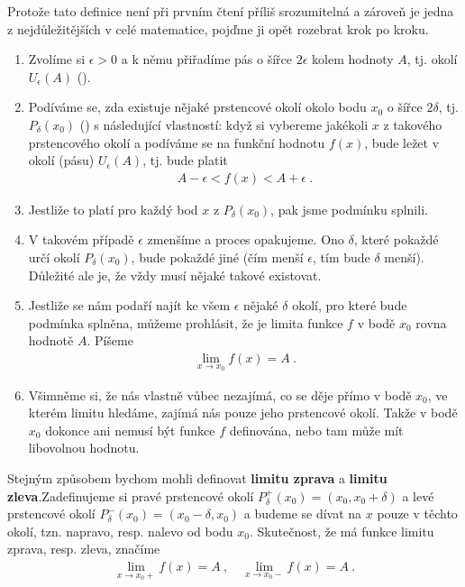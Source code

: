 Protože tato definice není při prvním čtení příliš srozumitelná a zároveň je jedna z nejdůležitějších v celé matematice, pojďme ji opět rozebrat krok po kroku.
\begin{enumerate}
    \item Zvolíme si $\epsilon>0$ a k němu přiřadíme pás o šířce $2\epsilon$ kolem hodnoty $A$, tj. okolí $U_\epsilon(A)$ ().
    \item Podíváme se, zda existuje nějaké prstencové okolí okolo bodu $x_0$ o šířce $2\delta$, tj. $P_\delta (x_0)$ () s následující vlastností: když si vybereme jakékoli $x$ z takového prstencového okolí a podíváme se na funkční hodnotu $f(x)$, bude ležet v okolí (pásu) $U_\epsilon(A)$, tj. bude platit
    \begin{align}
        A - \epsilon < f(x) < A + \epsilon \:.
    \end{align}
    \item Jestliže to platí pro každý bod $x$ z $P_\delta(x_0)$, pak jsme podmínku splnili.
    \item V takovém případě $\epsilon$ zmenšíme a proces opakujeme. Ono $\delta$, které pokaždé určí okolí $P_\delta (x_0)$, bude pokaždé jiné (čím menší $\epsilon$, tím bude $\delta$ menší). Důležité ale je, že vždy musí nějaké takové existovat.
    \item Jestliže se nám podaří najít ke všem $\epsilon$ nějaké $\delta$ okolí, pro které bude podmínka splněna, můžeme prohlásit, že je limita funkce $f$ v bodě $x_0$ rovna hodnotě $A$. Píšeme
    \begin{align}
        \lim_{x \rightarrow x_0} f(x) = A \:.
    \end{align}
    \item Všimněme si, že nás vlastně vůbec nezajímá, co se děje přímo v bodě $x_0$, ve kterém limitu hledáme, zajímá nás pouze jeho prstencové okolí. Takže v bodě $x_0$ dokonce ani nemusí být funkce $f$ definována, nebo tam může mít libovolnou hodnotu.
\end{enumerate}

Stejným způsobem bychom mohli definovat \textbf{limitu zprava} a \textbf{limitu zleva}.\newline Zadefinujeme si pravé prstencové okolí $P_{\delta}^{+}(x_0) = (x_0, x_0 + \delta)$ a levé prstencové okolí $P_{\delta}^{-}(x_0) = (x_0 - \delta, x_0)$ a budeme se dívat na $x$ pouze v těchto okolí, tzn. napravo, resp. nalevo od bodu $x_0$. Skutečnost, že má funkce limitu zprava, resp. zleva, značíme
\begin{align}
    \lim_{x \rightarrow x_0 +} f(x) = A \:, \quad \lim_{x \rightarrow x_0 -} f(x) = A \:.
\end{align}

